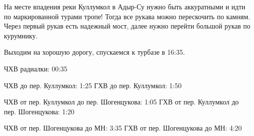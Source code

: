 На месте впадения реки Куллумкол в Адыр-Су нужно быть аккуратными и идти по маркированной турами тропе! Тогда все рукава можно перескочить по камням.
Через первый рукав есть надежный мост, далее нужно перейти большой рукав по курумнику.

Выходим на хорошую дорогу, спускаемся к турбазе в 16:35.






ЧХВ радиалки: 00:35

ЧХВ до пер. Куллумкол: 1:25
ГХВ до пер. Куллумкол: 1:50

ЧХВ от пер. Куллумкол до пер. Шогенцукова: 1:05
ГХВ от пер. Куллумкол до пер. Шогенцукова: 1:20

ЧХВ от пер. Шогенцукова до МН: 3:35
ГХВ от пер. Шогенцукова до МН: 4:20



    \FloatBarrier
